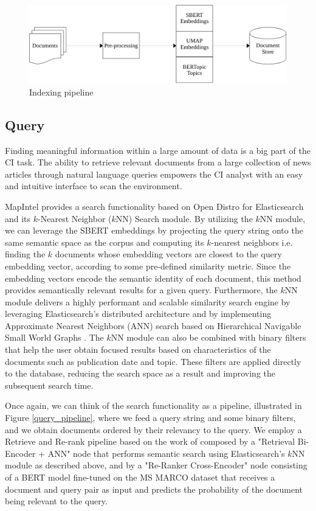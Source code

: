 \documentclass[a4paper]{article}
\begin{document}
\begin{figure}[H]
  \centering
  \includegraphics[scale=0.7]{./assets/indexing_pipeline}
  \caption{Indexing pipeline}
  \label{indexing_pipeline}
\end{figure}

\subsection{Query}
Finding meaningful information within a large amount of data is a big part of the CI task. The ability to retrieve relevant documents from a large collection of news articles through natural language queries empowers the CI analyst with an easy and intuitive interface to scan the environment.

MapIntel provides a search functionality based on Open Distro for Elasticsearch and its $k$-Nearest Neighbor ($k$NN) Search module. By utilizing the $k$NN module, we can leverage the SBERT embeddings by projecting the query string onto the same semantic space as the corpus and computing its $k$-nearest neighbors i.e. finding the $k$ documents whose embedding vectors are closest to the query embedding vector, according to some pre-defined similarity metric. Since the embedding vectors encode the semantic identity of each document, this method provides semantically relevant results for a given query. Furthermore, the $k$NN module delivers a highly performant and scalable similarity search engine by leveraging Elasticsearch’s distributed architecture and by implementing Approximate Nearest Neighbors (ANN) search based on Hierarchical Navigable Small World Graphs \citep{malkov2018}. The $k$NN module can also be combined with binary filters that help the user obtain focused results based on characteristics of the documents such as publication date and topic. These filters are applied directly to the database, reducing the search space as a result and improving the subsequent search time.

Once again, we can think of the search functionality as a pipeline, illustrated in Figure \ref{query_pipeline}, where we feed a query string and some binary filters, and we obtain documents ordered by their relevancy to the query. We employ a Retrieve and Re-rank pipeline based on the work of \citet{nogueira2020a, kratzwald2019} composed by a "Retrieval Bi-Encoder + ANN" node that performs semantic search using Elasticsearch’s $k$NN module as described above, and by a "Re-Ranker Cross-Encoder" node consisting of a BERT model fine-tuned on the MS MARCO dataset that receives a document and query pair as input and predicts the probability of the document being relevant to the query. 
\end{document}
